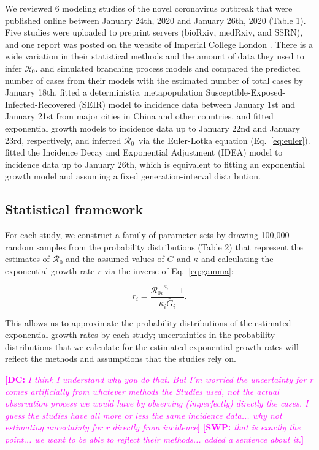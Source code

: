 \documentclass[12pt]{article}
\newcommand{\eref}[1]{Eq.~\ref{eq:#1}}
\newcommand{\Rx}[1]{\ensuremath{{\mathcal R}_{#1}}}
\newcommand{\Ro}{\Rx{0}\xspace}
\newcommand{\comment}[3]{\textcolor{#1}{\textbf{[#2: }\textsl{#3}\textbf{]}}}
\newcommand{\swp}[1]{\comment{magenta}{SWP}{#1}}
\newcommand{\dc}[1]{\comment{magenta}{DC}{#1}}
\begin{document}
We reviewed 6 modeling studies of the novel coronavirus outbreak that were published online between January 24th, 2020 and January 26th, 2020 (Table 1).
Five studies \citep{liuncov, majumderncov, readncov, riouncov, zhaoncov} were uploaded to preprint servers (bioRxiv, medRxiv, and SSRN), and one report was posted on the website of Imperial College London \citep{imaincov}.
There is a wide variation in their statistical methods and the amount of data they used to infer \Ro.
\cite{imaincov} and \cite{riouncov} simulated branching process models and compared the predicted number of cases from their models with the estimated number of total cases by January 18th.
\cite{readncov} fitted a deterministic, metapopulation Susceptible-Exposed-Infected-Recovered (SEIR) model to incidence data between January 1st and January 21st from major cities in China and other countries.
\cite{zhaoncov} and \cite{liuncov} fitted exponential growth models to incidence data up to January 22nd and January 23rd, respectively, and inferred \Ro\ via the Euler-Lotka equation (\eref{euler}).
\cite{majumderncov} fitted the Incidence Decay and Exponential Adjustment (IDEA) model \citep{fisman2013idea} to incidence data up to January 26th, which is equivalent to fitting an exponential growth model and assuming a fixed generation-interval distribution.

\subsection{Statistical framework}

For each study, we construct a family of parameter sets by drawing 100,000 random samples from the probability distributions (Table 2) that represent the estimates of \Ro and the assumed values of $\bar G$ and $\kappa$ and calculating the exponential growth rate $r$ via the inverse of \eref{gamma}:
\begin{linenomath*}
\begin{equation}
r_i = \frac{{\mathcal R_{0i}}^{\kappa_i} - 1}{\kappa_i \bar{G}_i}.
\end{equation}
\end{linenomath*}
This allows us to approximate the probability distributions of the estimated exponential growth rates by each study;
uncertainties in the probability distributions that we calculate for the estimated exponential growth rates will reflect the methods and assumptions that the studies rely on.

\dc{I think I understand why you do that. But I’m worried the uncertainty for r comes
artificially from whatever methods the Studies used, not the actual observation process we
would have by observing (imperfectly) directly the cases. I guess the studies have all more or
less the same incidence data... why not estimating uncertainty for r directly from incidence}
\swp{that is exactly the point... we want to be able to reflect their methods... added a sentence about it.}
\end{document}
